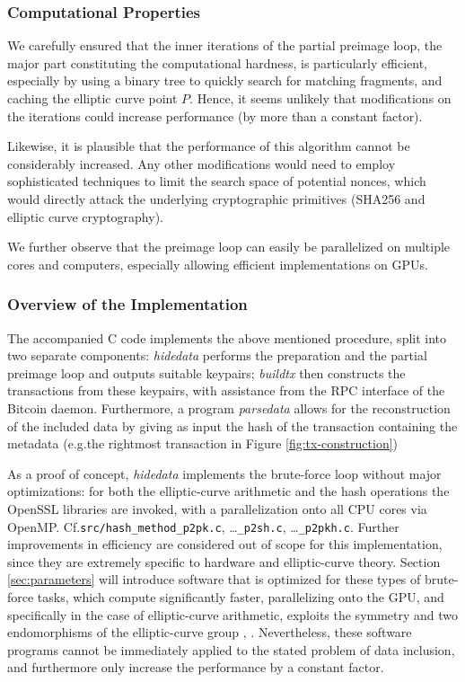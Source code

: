 \documentclass[a4paper,11pt,titlepage]{scrbook}
\begin{document}
\subsubsection*{Computational Properties}

We carefully ensured that the inner iterations of the partial preimage loop, the major part constituting the computational hardness, is particularly efficient, especially by using a binary tree to quickly search for matching fragments, and caching the elliptic curve point $P$.
Hence, it seems unlikely that modifications on the iterations could increase performance (by more than a constant factor).

Likewise, it is plausible that the performance of this algorithm cannot be considerably increased.
Any other modifications would need to employ sophisticated techniques to limit the search space of potential nonces, which would directly attack the underlying cryptographic primitives (SHA256 and elliptic curve cryptography).

We further observe that the preimage loop can easily be parallelized on multiple cores and computers, especially allowing efficient implementations on GPUs.

\subsubsection*{Overview of the Implementation}

The accompanied C code implements the above mentioned procedure, split into two separate components: \emph{hidedata} performs the preparation and the partial preimage loop and outputs suitable keypairs; \emph{buildtx} then constructs the transactions from these keypairs, with assistance from the RPC interface of the Bitcoin daemon.
Furthermore, a program \emph{parsedata} allows for the reconstruction of the included data by giving as input the hash of the transaction containing the metadata (e.g.\@ the rightmost transaction in Figure \ref{fig:tx-construction})

As a proof of concept, \emph{hidedata} implements the brute-force loop without major optimizations: for both the elliptic-curve arithmetic and the hash operations the OpenSSL libraries are invoked, with a parallelization onto all CPU cores via OpenMP. Cf.\@ \texttt{src/hash\_method\allowbreak\_p2pk.c}, \dots\texttt{\_p2sh.c}, \dots\texttt{\_p2pkh.c}.
Further improvements in efficiency are considered out of scope for this implementation, since they are extremely specific to hardware and elliptic-curve theory.
Section \ref{sec:parameters} will introduce software that is optimized for these types of brute-force tasks, which compute significantly faster, parallelizing onto the GPU, and specifically in the case of elliptic-curve arithmetic, exploits the symmetry and two endomorphisms of the elliptic-curve group \cite{vanitysearch_2019}, \cite{hashcat_2020}.
Nevertheless, these software programs cannot be immediately applied to the stated problem of data inclusion, and furthermore only increase the performance by a constant factor.
\end{document}
